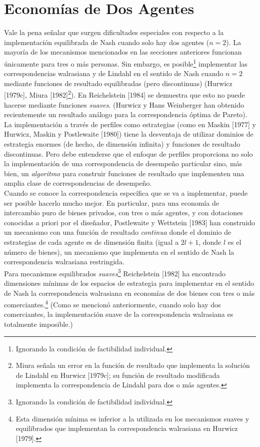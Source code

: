 \documentclass[12pt, letterpaper]{article}
\begin{document}
\section*{Economías de Dos Agentes}
Vale la pena señalar que surgen dificultades especiales con respecto a la implementación equilibrada de Nash cuando solo hay dos agentes ($n = 2$). La mayoría de los mecanismos mencionados en las secciones anteriores funcionan únicamente para tres o más personas. Sin embargo, es posible\footnote{Ignorando la condición de factibilidad individual.} implementar las correspondencias walrasiana y de Lindahl en el sentido de Nash cuando $n = 2$ mediante funciones de resultado equilibradas (pero discontinuas) (Hurwicz [1979c], Miura [1982]\footnote{Miura señala un error en la función de resultado que implementa la solución de Lindahl en Hurwicz [1979c]; su función de resultado modificada implementa la correspondencia de Lindahl para dos o más agentes.}). En Reichelstein [1984] se demuestra que esto no puede hacerse mediante funciones \textit{suaves}. (Hurwicz y Hans Weinberger han obtenido recientemente un resultado análogo para la correspondencia óptima de Pareto).  \\

La implementación a través de perfiles como estrategias (como en Maskin [1977] y Hurwicz, Maskin y Postlewaite [1980]) tiene la desventaja de utilizar dominios de estrategia enormes (de hecho, de dimensión infinita) y funciones de resultado discontinuas. Pero debe entenderse que el enfoque de perfiles proporciona no solo la implementación de una correspondencia de desempeño particular sino, más bien, un \textit{algoritmo} para construir funciones de resultado que implementen una amplia clase de correspondencias de desempeño. \\

Cuando se conoce la correspondencia específica que se va a implementar, puede ser posible hacerlo mucho mejor. En particular, para una economía de intercambio puro de bienes privados, con tres o más agentes, y con dotaciones conocidas a priori por el diseñador, Postlewaite y Wettstein [1983] han construido un mecanismo con una función de resultado \textit{continua} donde el dominio de estrategias de cada agente es de dimensión finita (igual a $2l + 1$, donde $l$ es el número de bienes), un mecanismo que implementa en el sentido de Nash la correspondencia walrasiana restringida. \\

Para mecanismos equilibrados \textit{suaves}\footnote{Ignorando la condición de factibilidad individual.} Reichelstein [1982] ha encontrado dimensiones mínimas de los espacios de estrategia para implementar en el sentido de Nash la correspondencia walrasiana en economías de dos bienes con tres o más comerciantes.\footnote{Esta dimensión mínima es inferior a la utilizada en los mecanismos suaves y equilibrados que implementan la correspondencia walrasiana en Hurwicz [1979].} (Como se mencionó anteriormente, cuando solo hay dos comerciantes, la implementación suave de la correspondencia walrasiana es totalmente imposible.)
\\
\end{document}
